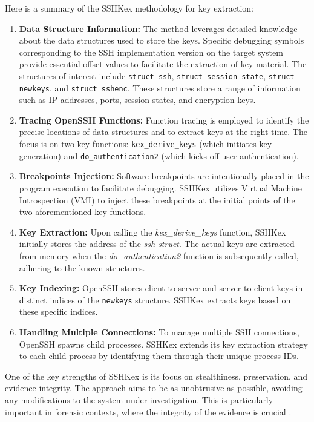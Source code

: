 Here is a summary of the SSHKex methodology for key extraction:
\begin{enumerate}
    \item \textbf{Data Structure Information:} The method leverages detailed knowledge about the data structures used to store the keys. Specific debugging symbols corresponding to the SSH implementation version on the target system provide essential offset values to facilitate the extraction of key material. The structures of interest include \texttt{struct ssh}, \texttt{struct session\_state}, \texttt{struct newkeys}, and \texttt{struct sshenc}. These structures store a range of information such as IP addresses, ports, session states, and encryption keys.

    \item \textbf{Tracing OpenSSH Functions:} Function tracing is employed to identify the precise locations of data structures and to extract keys at the right time. The focus is on two key functions: \texttt{kex\_derive\_keys} (which initiates key generation) and \texttt{do\_authentication2} (which kicks off user authentication).

    \item \textbf{Breakpoints Injection:} Software breakpoints are intentionally placed in the program execution to facilitate debugging. SSHKex utilizes Virtual Machine Introspection (VMI) to inject these breakpoints at the initial points of the two aforementioned key functions.

    \item \textbf{Key Extraction:} Upon calling the \textit{kex\_derive\_keys} function, SSHKex initially stores the address of the \textit{ssh struct}. The actual keys are extracted from memory when the \textit{do\_authentication2} function is subsequently called, adhering to the known structures. 

    \item \textbf{Key Indexing:} OpenSSH stores client-to-server and server-to-client keys in distinct indices of the \texttt{newkeys} structure. SSHKex extracts keys based on these specific indices.

    \item \textbf{Handling Multiple Connections:} To manage multiple SSH connections, OpenSSH spawns child processes. SSHKex extends its key extraction strategy to each child process by identifying them through their unique process IDs.
\end{enumerate}

One of the key strengths of SSHKex is its focus on stealthiness, preservation, and evidence integrity. The approach aims to be as unobtrusive as possible, avoiding any modifications to the system under investigation. This is particularly important in forensic contexts, where the integrity of the evidence is crucial \cite{SSHkex22}.

